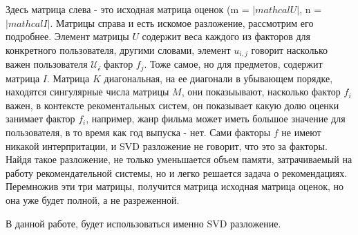 Здесь матрица слева - это исходная матрица оценок (m = $|mathcal{U}|$, n = $|mathcal{I}|$. Матрицы справа и есть искомое разложение, рассмотрим его подробнее. Элемент матрицы $U$ содержит веса каждого из факторов для конкретного пользователя, другими словами, элемент $u_{i,j}$ говорит насколько важен пользователя $\mathcal{U_i}$ фактор $f_j$. Тоже самое, но для предметов, содержит матрица $I$. Матрица $K$ диагональная, на ее диагонали в убывающем порядке, находятся сингулярные числа матрицы $M$, они показыывают, насколько фактор $f_i$ важен, в контексте рекоментальных систем, он показывает какую долю оценки занимает фактор $f_i$, например, жанр фильма может иметь большое значение для пользователя, в то время как год выпуска - нет. Сами факторы $f$ не имеют никакой интерпритации, и SVD разложение не говорит, что это за факторы. Найдя такое разложение, не только уменьшается объем памяти, затрачиваемый на работу рекомендательной системы, но и легко решается задача о рекомендациях. Перемножив эти три матрицы, получится матрица исходная матрица оценок, но она уже будет полной, а не разреженной.

В данной работе, будет использоваться именно SVD разложение.